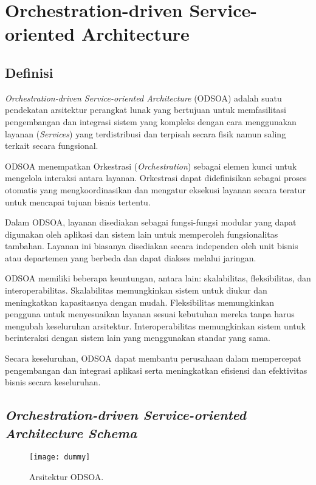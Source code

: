 \chapter{Orchestration-driven Service-oriented Architecture}

\section{Definisi}
\textit{Orchestration-driven Service-oriented Architecture} (ODSOA) adalah suatu pendekatan arsitektur perangkat lunak yang bertujuan untuk memfasilitasi pengembangan dan integrasi sistem yang kompleks dengan cara menggunakan layanan (\textit{Services}) yang terdistribusi dan terpisah secara fisik namun saling terkait secara fungsional.

ODSOA menempatkan Orkestrasi (\textit{Orchestration}) sebagai elemen kunci untuk mengelola interaksi antara layanan. Orkestrasi dapat didefinisikan sebagai proses otomatis yang mengkoordinasikan dan mengatur eksekusi layanan secara teratur untuk mencapai tujuan bisnis tertentu.

Dalam ODSOA, layanan disediakan sebagai fungsi-fungsi modular yang dapat digunakan oleh aplikasi dan sistem lain untuk memperoleh fungsionalitas tambahan. Layanan ini biasanya disediakan secara independen oleh unit bisnis atau departemen yang berbeda dan dapat diakses melalui jaringan.

ODSOA memiliki beberapa keuntungan, antara lain: skalabilitas, fleksibilitas, dan interoperabilitas. Skalabilitas memungkinkan sistem untuk diukur dan meningkatkan kapasitasnya dengan mudah. Fleksibilitas memungkinkan pengguna untuk menyesuaikan layanan sesuai kebutuhan mereka tanpa harus mengubah keseluruhan arsitektur. Interoperabilitas memungkinkan sistem untuk berinteraksi dengan sistem lain yang menggunakan standar yang sama.

Secara keseluruhan, ODSOA dapat membantu perusahaan dalam mempercepat pengembangan dan integrasi aplikasi serta meningkatkan efisiensi dan efektivitas bisnis secara keseluruhan.
	
\section{\textit{Orchestration-driven Service-oriented Architecture Schema}}

\begin{figure}[h]
	\centering
\texttt{[image: dummy]}
	\caption {Arsitektur ODSOA.}
	\label{fig:Arsitektur ODSOA} 
\end{figure}


